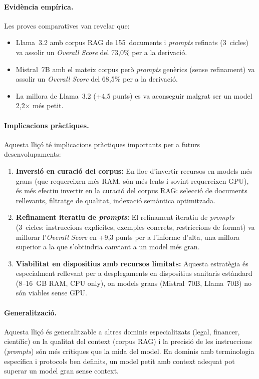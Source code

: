\documentclass[CAT]{TFUOC}%
\begin{document}
\paragraph{Evidència empírica.}
Les proves comparatives van revelar que:

\begin{itemize}
    \item Llama~3.2 amb corpus RAG de 155~documents i \textit{prompts} refinats (3~cicles) va assolir un \textit{Overall Score} del 73,0\% per a la derivació.
    \item Mistral~7B amb el mateix corpus però \textit{prompts} genèrics (sense refinament) va assolir un \textit{Overall Score} del 68,5\% per a la derivació.
    \item La millora de Llama~3.2 (+4,5 punts) es va aconseguir malgrat ser un model 2,2$\times$ més petit.
\end{itemize}

\paragraph{Implicacions pràctiques.}
Aquesta lliçó té implicacions pràctiques importants per a futurs desenvolupaments:

\begin{enumerate}
    \item \textbf{Inversió en curació del corpus:} En lloc d'invertir recursos en models més grans (que requereixen més RAM, són més lents i sovint requereixen GPU), és més efectiu invertir en la curació del corpus RAG: selecció de documents rellevants, filtratge de qualitat, indexació semàntica optimitzada.
    
    \item \textbf{Refinament iteratiu de \textit{prompts}:} El refinament iteratiu de \textit{prompts} (3~cicles: instruccions explícites, exemples concrets, restriccions de format) va millorar l'\textit{Overall Score} en +9,3 punts per a l'informe d'alta, una millora superior a la que s'obtindria canviant a un model més gran.
    
    \item \textbf{Viabilitat en dispositius amb recursos limitats:} Aquesta estratègia és especialment rellevant per a desplegaments en dispositius sanitaris estàndard (8--16~GB RAM, CPU only), on models grans (Mistral~70B, Llama~70B) no són viables sense GPU.
\end{enumerate}

\paragraph{Generalització.}
Aquesta lliçó és generalitzable a altres dominis especialitzats (legal, financer, científic) on la qualitat del context (corpus RAG) i la precisió de les instruccions (\textit{prompts}) són més crítiques que la mida del model. En dominis amb terminologia específica i protocols ben definits, un model petit amb context adequat pot superar un model gran sense context.
\end{document}
